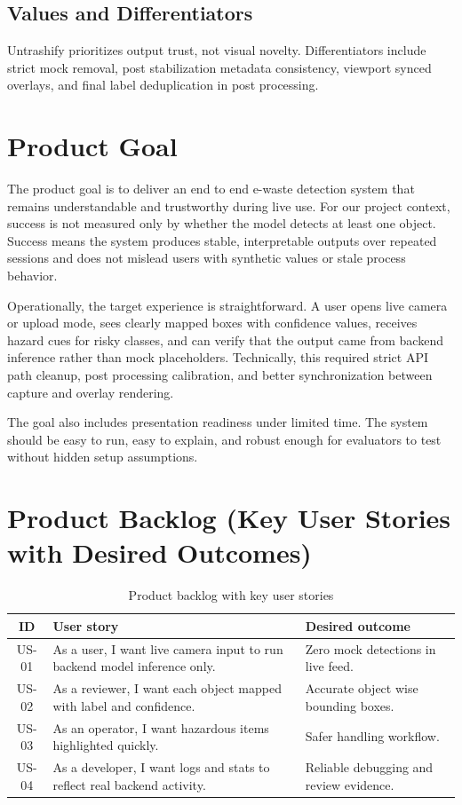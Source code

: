 \documentclass[12pt,a4paper]{report}
\begin{document}
\subsection{Values and Differentiators}
Untrashify prioritizes output trust, not visual novelty. Differentiators include strict mock removal, post stabilization metadata consistency, viewport synced overlays, and final label deduplication in post processing.

\section{Product Goal}
The product goal is to deliver an end to end e-waste detection system that remains understandable and trustworthy during live use. For our project context, success is not measured only by whether the model detects at least one object. Success means the system produces stable, interpretable outputs over repeated sessions and does not mislead users with synthetic values or stale process behavior.

Operationally, the target experience is straightforward. A user opens live camera or upload mode, sees clearly mapped boxes with confidence values, receives hazard cues for risky classes, and can verify that the output came from backend inference rather than mock placeholders. Technically, this required strict API path cleanup, post processing calibration, and better synchronization between capture and overlay rendering.

The goal also includes presentation readiness under limited time. The system should be easy to run, easy to explain, and robust enough for evaluators to test without hidden setup assumptions.

\section{Product Backlog (Key User Stories with Desired Outcomes)}
\begin{table}[H]
    \centering
    \caption{Product backlog with key user stories}
    \begin{tabularx}{\textwidth}{|c|X|X|}
        \hline
        ID & User story & Desired outcome \\
        \hline
        US-01 & As a user, I want live camera input to run backend model inference only. & Zero mock detections in live feed. \\
        \hline
        US-02 & As a reviewer, I want each object mapped with label and confidence. & Accurate object wise bounding boxes. \\
        \hline
        US-03 & As an operator, I want hazardous items highlighted quickly. & Safer handling workflow. \\
        \hline
        US-04 & As a developer, I want logs and stats to reflect real backend activity. & Reliable debugging and review evidence. \\
        \hline
    \end{tabularx}
\end{table}
\end{document}

